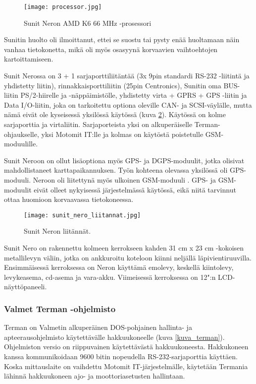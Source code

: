 \begin{figure}[H]
\centering
\texttt{[image: processor.jpg]}
\caption{Sunit Neron AMD K6 66 MHz -prosessori}
\label{kuva_prossu}
\end{figure}

Sunitin huolto oli ilmoittanut, ettei se suostu tai pysty enää huoltamaan näin vanhaa tietokonetta, mikä oli myös osasyynä korvaavien vaihtoehtojen kartoittamiseen.

Sunit Nerossa on 3 + 1 sarjaporttiliitäntää (3x 9pin standardi RS-232 -liitintä ja yhdistetty liitin), rinnakkaisporttiliitin (25pin Centronics), Sunitin oma BUS-liitin PS/2-hiirelle ja -näppäimistölle, yhdistetty virta + GPRS + GPS -liitin ja Data I/O-liitin, joka on tarkoitettu optiona oleville CAN- ja SCSI-väylälle, mutta nämä eivät ole kyseisessä yksilössä käytössä (kuva \ref{kuva_liitannat}).  Käytössä on kolme sarjaporttia ja virtaliitin. Sarjaporteista yksi on alkuperäiselle Terman-ohjaukselle, yksi Motomit IT:lle ja kolmas on käytöstä poistetulle GSM-moduulille.

Sunit Neroon on ollut lisäoptiona myös GPS- ja DGPS-moduulit, jotka olisivat mahdollistaneet karttapaikannuksen. Työn kohteena olevassa yksilössä oli GPS-moduuli. Neroon oli liitettynä myös ulkoinen GSM-moduuli \cite{nero:manual}. GPS- ja GSM-moduulit eivät olleet nykyisessä järjestelmässä käytössä, eikä niitä tarvinnut ottaa huomioon korvaavassa tietokoneessa.\newline\newline

\begin{figure}[H]
\centering
\texttt{[image: sunit\_nero\_liitannat.jpg]}
\caption{Sunit Neron liitännät.}
\label{kuva_liitannat}
\end{figure}

Sunit Nero on rakennettu kolmeen kerrokseen kahden 31 cm x 23 cm -kokoisen metallilevyn väliin, jotka on ankkuroitu koteloon kiinni neljällä  läpivientiruuvilla. Ensimmäisessä kerroksessa on Neron käyttämä emolevy, keskellä kiintolevy, levykeasema, cd-asema ja vara-akku. Viimeisessä kerroksessa on 12":n LCD-näyttöpaneeli.

\subsubsection{Valmet Terman -ohjelmisto}
Terman on Valmetin alkuperäinen DOS-pohjainen hallinta- ja apteerausohjelmisto käytettävälle hakkuukoneelle (kuva \ref{kuva_terman}). Ohjelmiston versio on riippuvainen käytettävästä hakkuukoneesta. Hakkukoneen kanssa kommunikoidaan 9600 bitin nopeudella RS-232-sarjaporttia käyttäen. Koska mittauslaite on vaihdettu Motomit IT-järjestelmälle, käytetään Termania lähinnä hakkuukoneen ajo- ja moottoriasetusten hallintaan.
\newline\newline

